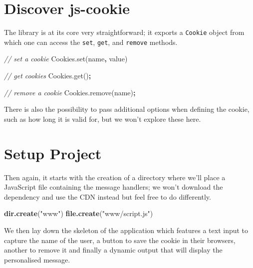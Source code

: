 \documentclass[
]{krantz}
\makeatletter
\newenvironment{Shaded}{\begin{snugshade}}{\end{snugshade}}
\newcommand{\AttributeTok}[1]{\textcolor[rgb]{0.61,0.61,0.61}{#1}}
\newcommand{\CommentTok}[1]{\textcolor[rgb]{0.37,0.37,0.37}{\textit{#1}}}
\newcommand{\KeywordTok}[1]{\textcolor[rgb]{0.27,0.27,0.27}{\textbf{#1}}}
\newcommand{\NormalTok}[1]{#1}
\newcommand{\OperatorTok}[1]{\textcolor[rgb]{0.43,0.43,0.43}{\textbf{#1}}}
\newcommand{\StringTok}[1]{\textcolor[rgb]{0.5,0.5,0.5}{#1}}
\newcommand{\VariableTok}[1]{\textcolor[rgb]{0,0,0}{#1}}
\newenvironment{kframe}{%
\medskip{}
\setlength{\fboxsep}{.8em}
 \def\at@end@of@kframe{}%
 \ifinner\ifhmode%
  \def\at@end@of@kframe{\end{minipage}}%
  \begin{minipage}{\columnwidth}%
 \fi\fi%
 \def\FrameCommand##1{\hskip\@totalleftmargin \hskip-\fboxsep
 \colorbox{shadecolor}{##1}\hskip-\fboxsep
     \hskip-\linewidth \hskip-\@totalleftmargin \hskip\columnwidth}%
 \MakeFramed {\advance\hsize-\width
   \@totalleftmargin\z@ \linewidth\hsize
   \@setminipage}}%
 {\par\unskip\endMakeFramed%
 \at@end@of@kframe}
\renewenvironment{Shaded}{\begin{kframe}}{\end{kframe}}
\makeatother
\begin{document}
\hypertarget{shiny-cookies-discover}{%
\section{Discover js-cookie}\label{shiny-cookies-discover}}

The library is at its core very straightforward; it exports a \texttt{Cookie} object from which one can access the \texttt{set}, \texttt{get}, and \texttt{remove} methods.

\begin{Shaded}
\begin{Highlighting}[]
\CommentTok{// set a cookie}
\VariableTok{Cookies}\NormalTok{.}\AttributeTok{set}\NormalTok{(}\StringTok{\textquotesingle{}name\textquotesingle{}}\OperatorTok{,} \StringTok{\textquotesingle{}value\textquotesingle{}}\NormalTok{)}

\CommentTok{// get cookies}
\VariableTok{Cookies}\NormalTok{.}\AttributeTok{get}\NormalTok{()}\OperatorTok{;}

\CommentTok{// remove a cookie}
\VariableTok{Cookies}\NormalTok{.}\AttributeTok{remove}\NormalTok{(}\StringTok{\textquotesingle{}name\textquotesingle{}}\NormalTok{)}\OperatorTok{;}
\end{Highlighting}
\end{Shaded}

There is also the possibility to pass additional options when defining the cookie, such as how long it is valid for, but we won't explore these here.

\hypertarget{shiny-cookies-setup}{%
\section{Setup Project}\label{shiny-cookies-setup}}

Then again, it starts with the creation of a directory where we'll place a JavaScript file containing the message handlers; we won't download the dependency and use the CDN instead but feel free to do differently.

\begin{Shaded}
\begin{Highlighting}[]
\KeywordTok{dir.create}\NormalTok{(}\StringTok{"www"}\NormalTok{)}
\KeywordTok{file.create}\NormalTok{(}\StringTok{"www/script.js"}\NormalTok{)}
\end{Highlighting}
\end{Shaded}

We then lay down the skeleton of the application which features a text input to capture the name of the user, a button to save the cookie in their browsers, another to remove it and finally a dynamic output that will display the personalised message.
\end{document}
